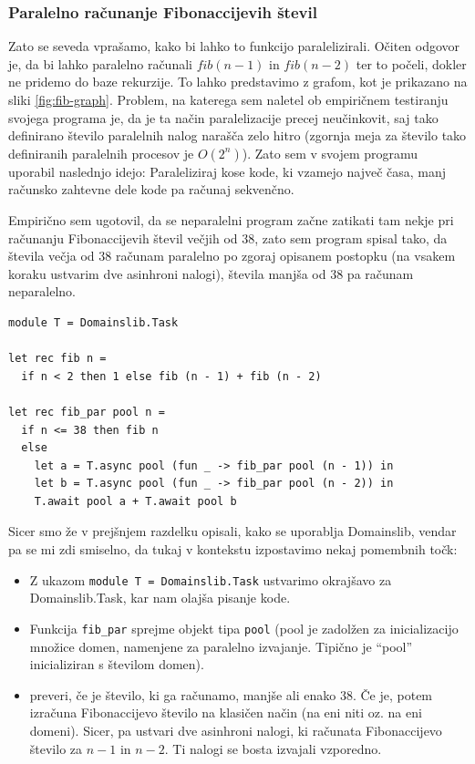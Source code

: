 \documentclass[mat1, tisk]{fmfdelo}
\begin{document}
\subsubsection{Paralelno računanje Fibonaccijevih števil}

Zato se seveda vprašamo, kako bi lahko to funkcijo paralelizirali. Očiten odgovor je, da bi lahko paralelno računali
$fib(n-1)$ in $fib(n-2)$ ter to počeli, dokler ne pridemo do baze rekurzije. To lahko predstavimo z grafom, kot je
prikazano na sliki \ref{fig:fib-graph}. Problem, na katerega sem naletel ob empiričnem testiranju svojega programa
je, da je ta način paralelizacije precej neučinkovit, saj tako definirano število paralelnih nalog narašča zelo hitro
(zgornja meja za število tako definiranih paralelnih procesov je $O(2^n)$).
Zato sem v svojem programu uporabil naslednjo idejo: Paraleliziraj kose kode, ki vzamejo največ časa, 
manj računsko zahtevne dele kode pa računaj sekvenčno.

Empirično sem ugotovil, da se neparalelni program začne zatikati tam nekje pri računanju Fibonaccijevih števil
večjih od $38$, zato sem program spisal tako, da števila večja od $38$ računam paralelno po zgoraj opisanem postopku
(na vsakem koraku ustvarim dve asinhroni nalogi), števila manjša od $38$ pa računam neparalelno.

\begin{lstlisting}
module T = Domainslib.Task

let rec fib n = 
  if n < 2 then 1 else fib (n - 1) + fib (n - 2)

let rec fib_par pool n =
  if n <= 38 then fib n
  else
    let a = T.async pool (fun _ -> fib_par pool (n - 1)) in
    let b = T.async pool (fun _ -> fib_par pool (n - 2)) in
    T.await pool a + T.await pool b
\end{lstlisting}

Sicer smo že v prejšnjem razdelku opisali, kako se uporablja Domainslib, vendar pa se mi zdi smiselno, da tukaj
v kontekstu izpostavimo nekaj pomembnih točk:
\begin{itemize}
  \item Z ukazom \texttt{module T = Domainslib.Task} ustvarimo okrajšavo za Domainslib.Task, kar nam olajša pisanje kode.
  \item Funkcija \texttt{fib\_par} sprejme objekt tipa \texttt{pool} (pool je zadolžen za inicializacijo množice domen, namenjene za 
  paralelno izvajanje. Tipično je ``pool'' inicializiran s številom domen).
  \item preveri, če je število, ki ga računamo, manjše ali enako 38. 
        Če je, potem izračuna Fibonaccijevo število na klasičen način (na eni niti oz. na eni domeni).
        Sicer, pa ustvari dve asinhroni nalogi, ki računata Fibonaccijevo število za $n-1$ in $n-2$. 
        Ti nalogi se bosta izvajali vzporedno.
\end{itemize}
\end{document}
